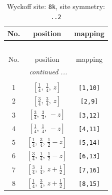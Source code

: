 \documentclass[fleqn,8pt]{jsarticle}
\begin{document}
\begin{longtable}{ccc}
\caption{Wyckoff site: {\tt 8k}, site symmetry: {\tt ..2}}
 \\
 \hline \hline
No. & position & mapping \\ \hline \endfirsthead

\multicolumn{2}{l}{\tablename\ \thetable{}} \\
 \hline \hline
No. & position & mapping \\ \hline \endhead

 \hline \hline
\multicolumn{2}{r}{\footnotesize\it continued ...} \\ \endfoot

 \hline \hline
\multicolumn{2}{r}{} \\ \endlastfoot

1 & $\left[ \frac{1}{4},\, \frac{1}{4},\, z \right]$ & {\tt [1,10]} \\ \hline
2 & $\left[ \frac{3}{4},\, \frac{3}{4},\, z \right]$ & {\tt [2,9]} \\ \hline
3 & $\left[ \frac{3}{4},\, \frac{3}{4},\, - z \right]$ & {\tt [3,12]} \\ \hline
4 & $\left[ \frac{1}{4},\, \frac{1}{4},\, - z \right]$ & {\tt [4,11]} \\ \hline
5 & $\left[ \frac{1}{4},\, \frac{3}{4},\, \frac{1}{2} - z \right]$ & {\tt [5,14]} \\ \hline
6 & $\left[ \frac{3}{4},\, \frac{1}{4},\, \frac{1}{2} - z \right]$ & {\tt [6,13]} \\ \hline
7 & $\left[ \frac{3}{4},\, \frac{1}{4},\, z + \frac{1}{2} \right]$ & {\tt [7,16]} \\ \hline
8 & $\left[ \frac{1}{4},\, \frac{3}{4},\, z + \frac{1}{2} \right]$ & {\tt [8,15]} \\
\end{longtable}
\renewcommand{\arraystretch}{1.2}
\end{document}
